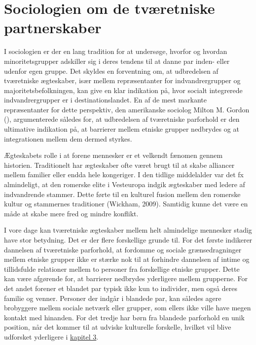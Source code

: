 \documentclass[
]{book}
\begin{document}
\section{Sociologien om de tværetniske partnerskaber}\label{sociologien-om-de-tvuxe6retniske-partnerskaber}

I sociologien er der en lang tradition for at undersøge, hvorfor og hvordan minoritetsgrupper adskiller sig i deres tendens til at danne par inden- eller udenfor egen gruppe. Det skyldes en forventning om, at udbredelsen af tværetniske ægteskaber, især mellem repræsentanter for indvandrergrupper og majoritetsbefolkningen, kan give en klar indikation på, hvor socialt integrerede indvandrergrupper er i destinationslandet. En af de mest markante repræsentanter for dette perspektiv, den amerikanske sociolog Milton M. Gordon (), argumenterede således for, at udbredelsen af tværetniske parforhold er den ultimative indikation på, at barrierer mellem etniske grupper nedbrydes og at integrationen mellem dem dermed styrkes.

Ægteskabets rolle i at forene mennesker er et velkendt fænomen gennem historien. Traditionelt har ægteskaber ofte været brugt til at skabe alliancer mellem familier eller endda hele kongeriger. I den tidlige middelalder var det fx almindeligt, at den romerske elite i Vesteuropa indgik ægteskaber med ledere af indvandrende stammer. Dette førte til en kulturel fusion mellem den romerske kultur og stammernes traditioner (Wickham, 2009). Samtidig kunne det være en måde at skabe mere fred og mindre konflikt.

I vore dage kan tværetniske ægteskaber mellem helt almindelige mennesker stadig have stor betydning. Det er der flere forskellige grunde til. For det første indikerer dannelsen af tværetniske parforhold, at fordomme og sociale grænsedragninger mellem etniske grupper ikke er stærke nok til at forhindre dannelsen af intime og tillidsfulde relationer mellem to personer fra forskellige etniske grupper. Dette kan være afgørende for, at barrierer nedbrydes yderligere mellem grupperne. For det andet forener et blandet par typisk ikke kun to individer, men også deres familie og venner. Personer der indgår i blandede par, kan således agere brobyggere mellem sociale netværk eller grupper, som ellers ikke ville have megen kontakt med hinanden. For det tredje har børn fra blandede parforhold en unik position, når det kommer til at udviske kulturelle forskelle, hvilket vil blive udforsket yderligere i \hyperref[kap3]{kapitel 3}.
\end{document}
